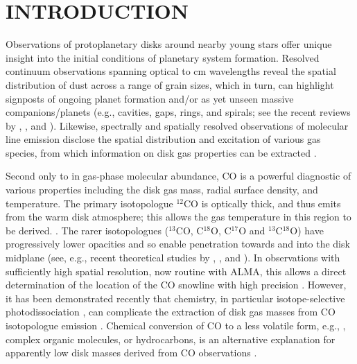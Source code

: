\documentclass[onecolumn]{aastex6}
\begin{document}
\section{INTRODUCTION}
\label{introduction}

Observations of protoplanetary disks around nearby young stars offer unique 
insight into the initial conditions of planetary system formation.  
Resolved continuum observations spanning optical to cm wavelengths  
reveal the spatial distribution of dust across a range of grain sizes, 
which in turn, can highlight signposts of ongoing planet formation 
and/or as yet unseen massive companions/planets (e.g., cavities, gaps, rings, 
and spirals; see the recent reviews by 
\citealt{espaillat14}, \citealt{andrews15}, and \citealt{grady15}).  
Likewise, spectrally and spatially resolved observations of molecular 
line emission disclose the spatial distribution and excitation of various 
gas species, from which information on disk gas properties can be extracted
\citep[e.g.,][]{dutrey14,sicilia-aguilar16}.

Second only to  in gas-phase molecular abundance, CO is a powerful
diagnostic of various properties including the disk gas mass, radial surface
density, and temperature.  The primary isotopologue $^{12}$CO is optically
thick, and thus emits  from the warm disk atmosphere; this allows the
gas temperature in this region to be derived. \citep[e.g.,][]{williams11,dutrey14}.   The
rarer isotopologues ($^{13}$CO, C$^{18}$O, C$^{17}$O and $^{13}$C$^{18}$O)  have
progressively lower opacities and so enable penetration  towards and into the
disk midplane  (see, e.g., recent theoretical studies by \citealt{bruderer13},
\citealt{miotello16}, and \citealt{yu16}).  In observations with sufficiently
high spatial resolution, now routine with ALMA,  this allows a direct
determination of the location of the CO snowline  with high precision
\citep[see, e.g.,][]{nomura16,schwarz16,zhang17}.   However, it has been
demonstrated recently that chemistry, in particular  isotope-selective
photodissociation \citep{visser09}, can complicate  the extraction of disk gas
masses from CO isotopologue emission  \citep{miotello14,miotello16}. Chemical
conversion of CO to a less volatile form, e.g., ,  complex organic
molecules, or hydrocarbons,   is an alternative explanation for apparently low
disk masses derived from  CO observations
\citep{helling14,furuya14,eistrup16,yu17}.  
\end{document}
